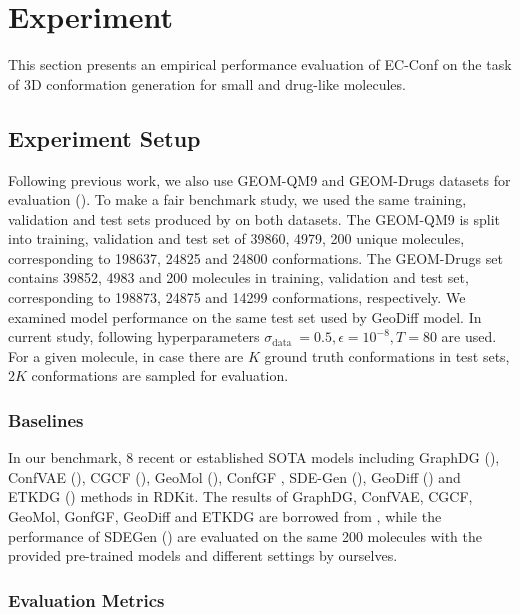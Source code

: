 \documentclass{article} %
\begin{document}
\section{Experiment}
This section presents an empirical performance evaluation of EC-Conf on the task of 3D conformation generation for small and drug-like molecules.



\subsection{Experiment Setup}

Following previous work, we also use GEOM-QM9 and GEOM-Drugs datasets for evaluation (\cite{liao2022equiformer}). To make a fair benchmark study, we used the same training, validation and test sets produced by \cite{shi2021learning} on both datasets. The GEOM-QM9 is split into training, validation and test set of 39860, 4979, 200 unique molecules, corresponding to 198637, 24825 and 24800 conformations. The GEOM-Drugs set contains 39852, 4983 and 200 molecules in training, validation and test set, corresponding to 198873, 24875 and 14299 conformations, respectively. 
We examined model performance on the same test set used by GeoDiff model.
In current study, following hyperparameters $\sigma_{\text {data }}=0.5, \epsilon=10^{-8}, T=80$ are used. For a given molecule, in case there are $K$ ground truth conformations in test sets, $2K$ conformations are sampled for evaluation.


\subsubsection{Baselines}
In our benchmark, 8 recent or established SOTA models including GraphDG (\cite{simm2019generative}), ConfVAE (\cite{DBLP:conf/icml/XuWLSBGT21}), CGCF (\cite{xu2021learning}), GeoMol (\cite{ganea2021geomol}), ConfGF \cite{shi2021learning}, SDE-Gen (\cite{zhang2023sdegen}), GeoDiff (\cite{xu2022geodiff}) and ETKDG (\cite{landrum2013rdkit}) methods in RDKit. The results of GraphDG, ConfVAE, CGCF, GeoMol, GonfGF, GeoDiff and ETKDG are borrowed from \cite{xu2022geodiff}, while the performance of SDEGen (\cite{zhang2023sdegen}) are evaluated on the same 200 molecules with the provided pre-trained models and different settings by ourselves.



\subsubsection{Evaluation Metrics}
\end{document}
